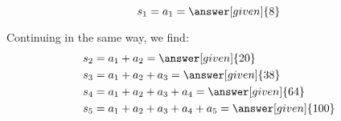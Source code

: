 \documentclass{ximera}
\begin{document}
\begin{exercise}
\begin{exercise}
\[      s_1 = a_1 = \answer[given]{8}       \]
      
Continuing in the same way, we find:     
     \begin{align*}
      	s_2 &=  a_1 +a_2 = \answer[given]{20}  \\ 
	s_3 &=  a_1 +a_2 + a_3 = \answer[given]{38}   \\ 
	s_4 &=  a_1 +a_2 +a_3 +a_4= \answer[given]{64}  \\ 
	s_5 &=  a_1 +a_2 +a_3+a_4+a_5= \answer[given]{100}    
    \end{align*}

\end{exercise}   
    
    \end{exercise}
\end{document}

